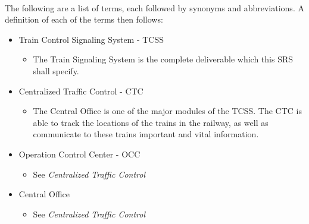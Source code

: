 \documentclass{article}
\begin{document}
    \paragraph{} The following are a list of terms, each followed by synonyms and abbreviations. A definition of each of the terms then follows:
    \begin{itemize}
        \item Train Control Signaling System - TCSS
            \begin{itemize}
            \item The Train Signaling System is the complete deliverable which this SRS  shall specify.
            \end{itemize}
        \item Centralized Traffic Control - CTC 
            \begin{itemize}
            \item The Central Office is one of the major modules of the TCSS. The CTC  is able to track the locations of the trains in the railway, as well as communicate to these trains important and vital information.
            \end{itemize}
        \item Operation Control Center - OCC
            \begin{itemize}
            \item See \emph{Centralized Traffic Control}
            \end{itemize}
        \item Central Office
            \begin{itemize}
            \item See \emph{Centralized Traffic Control}
            \end{itemize}


\end{itemize}
\end{document}
